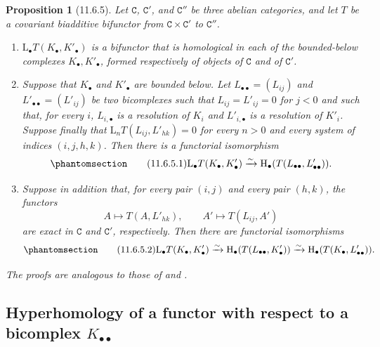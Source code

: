 \documentclass[oneside]{amsart}
\theoremstyle{ega-env-style}
\theoremstyle{ega-thm-env-style}
\newtheorem*{proposition}{Proposition}
\theoremstyle{ega-defn-env-style}
\def\cat{\mathtt}                   %
\def\HH{\mathrm{H}}                 %
\def\LL{\mathrm{L}}                 %
\def\simto{\xrightarrow{\sim}}
\let\EGAOriginalLabel\label
\renewcommand{\label}[1]{\phantomsection\EGAOriginalLabel{#1}}
\begin{document}
\begin{proposition}[11.6.5]
\label{0.11.6.5}
Let $\cat{C}$, $\cat{C}'$, and $\cat{C}''$ be three abelian categories, and let $T$ be a covariant biadditive bifunctor from $\cat{C}\times\cat{C}'$ to $\cat{C}''$.
\begin{enumerate}
  \item[{\rm(i)}] \emph{$\LL_\bullet T(K_\bullet,K'_\bullet)$ is a bifunctor that is homological in each of the bounded-below complexes $K_\bullet,K'_\bullet$, formed respectively of objects of $\cat{C}$ and of $\cat{C}'$.}

  \item[{\rm(ii)}] \emph{Suppose that $K_\bullet$ and $K'_\bullet$ are bounded below.
  Let $L_{\bullet\bullet}=(L_{ij})$ and $L'_{\bullet\bullet}=(L'_{ij})$ be two bicomplexes such that $L_{ij}=L'_{ij}=0$ for $j<0$ and such that, for every $i$, $L_{i,\bullet}$ is a resolution of $K_i$ and $L'_{i,\bullet}$ is a resolution of $K'_i$.
  Suppose finally that $\LL_nT(L_{ij},L'_{hk})=0$ for every $n>0$ and every system of indices $(i,j,h,k)$.
  Then there is a functorial isomorphism}
  \[
  \label{0.11.6.5.1}
  \tag{11.6.5.1}
    \LL_\bullet T(K_\bullet,K'_\bullet)
    \simto
    \HH_\bullet(T(L_{\bullet\bullet},L'_{\bullet\bullet})).
  \]

  \item[{\rm(iii)}] \emph{Suppose in addition that, for every pair $(i,j)$ and every pair $(h,k)$, the functors
  \[
    A\longmapsto T(A,L'_{hk}),
    \qquad
    A'\longmapsto T(L_{ij},A')
  \]
  are exact in $\cat{C}$ and $\cat{C}'$, respectively.
  Then there are functorial isomorphisms}
  \[
  \label{0.11.6.5.2}
  \tag{11.6.5.2}
    \LL_\bullet T(K_\bullet,K'_\bullet)
    \simto
    \HH_\bullet(T(L_{\bullet\bullet},K'_\bullet))
    \simto
    \HH_\bullet(T(K_\bullet,L'_{\bullet\bullet})).
  \]
\end{enumerate}

The proofs are analogous to those of  and .
\end{proposition}

\subsection{Hyperhomology of a functor with respect to a bicomplex $K_{\bullet\bullet}$}
\label{subsection:0.11.7}
\end{document}
